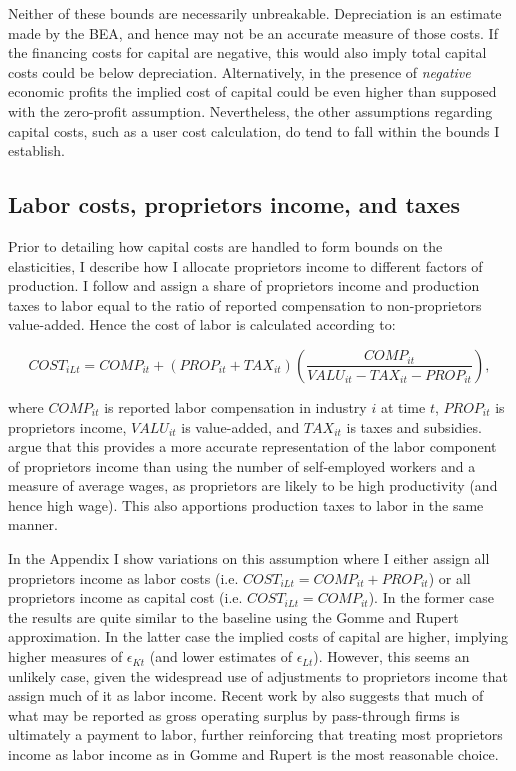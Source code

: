 \documentclass[11pt]{article}
\begin{document}
Neither of these bounds are necessarily unbreakable. Depreciation is an estimate made by the BEA, and hence may not be an accurate measure of those costs. If the financing costs for capital are negative, this would also imply total capital costs could be below depreciation. Alternatively, in the presence of \textit{negative} economic profits the implied cost of capital could be even higher than supposed with the zero-profit assumption. Nevertheless, the other assumptions regarding capital costs, such as a user cost calculation, do tend to fall within the bounds I establish.

\subsection{Labor costs, proprietors income, and taxes}
Prior to detailing how capital costs are handled to form bounds on the elasticities, I describe how I allocate proprietors income to different factors of production. I follow \cite{gommerupert2004} and assign a share of proprietors income and production taxes to labor equal to the ratio of reported compensation to non-proprietors value-added. Hence the cost of labor is calculated according to:

\begin{equation}
	COST_{iLt} = COMP_{it} + (PROP_{it} + TAX_{it})\left(\frac{COMP_{it}}{VALU_{it}-TAX_{it}-PROP_{it}}\right), \label{EQ_prop}
\end{equation}

where $COMP_{it}$ is reported labor compensation in industry $i$ at time $t$, $PROP_{it}$ is proprietors income, $VALU_{it}$ is value-added, and $TAX_{it}$ is taxes and subsidies. \cite{gommerupert2004} argue that this provides a more accurate representation of the labor component of proprietors income than using the number of self-employed workers and a measure of average wages, as proprietors are likely to be high productivity (and hence high wage). This also apportions production taxes to labor in the same manner.

In the Appendix I show variations on this assumption where I either assign all proprietors income as labor costs (i.e. $COST_{iLt} = COMP_{it} + PROP_{it}$) or all proprietors income as capital cost (i.e. $COST_{iLt} = COMP_{it}$). In the former case the results are quite similar to the baseline using the Gomme and Rupert approximation. In the latter case the implied costs of capital are higher, implying higher measures of $\epsilon_{Kt}$ (and lower estimates of $\epsilon_{Lt}$). However, this seems an unlikely case, given the widespread use of adjustments to proprietors income that assign much of it as labor income. Recent work by \cite{syzz2019} also suggests that much of what may be reported as gross operating surplus by pass-through firms is ultimately a payment to labor, further reinforcing that treating most proprietors income as labor income as in Gomme and Rupert is the most reasonable choice.
\end{document}

